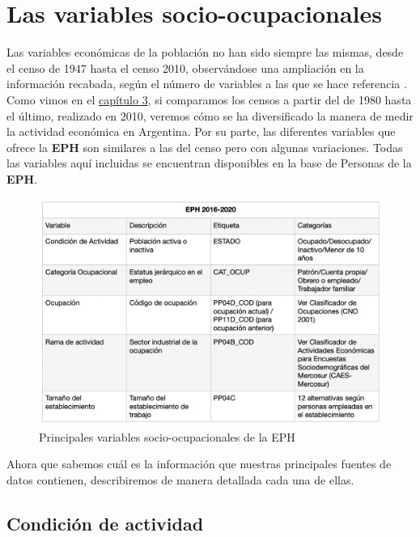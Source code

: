 \documentclass[
]{book}
\begin{document}
\hypertarget{las-variables-socio-ocupacionales}{%
\section{Las variables socio-ocupacionales}\label{las-variables-socio-ocupacionales}}

Las variables económicas de la población no han sido siempre las mismas, desde el censo de 1947 hasta el censo 2010, observándose una ampliación en la información recabada, según el número de variables a las que se hace referencia \citep{Sacco2015}. Como vimos en el \protect\hyperlink{fuentes2}{capítulo 3}, si comparamos los censos a partir del de 1980 hasta el último, realizado en 2010, veremos cómo se ha diversificado la manera de medir la actividad económica en Argentina. Por su parte, las diferentes variables que ofrece la \textbf{EPH} son similares a las del censo pero con algunas variaciones. Todas las variables aquí incluidas se encuentran disponibles en la base de Personas de la \textbf{EPH}.

\begin{figure}

{\centering \includegraphics[width=0.8\linewidth]{imagenes/t3_u4} 

}

\caption{Principales variables socio-ocupacionales de la EPH}\label{fig:unnamed-chunk-34}
\end{figure}

Ahora que sabemos cuál es la información que nuestras principales fuentes de datos contienen, describiremos de manera detallada cada una de ellas.

\hypertarget{condiciuxf3n-de-actividad}{%
\subsection{Condición de actividad}\label{condiciuxf3n-de-actividad}}
\end{document}
